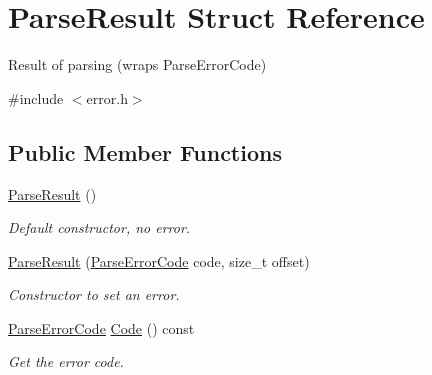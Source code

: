 \hypertarget{struct_parse_result}{}\section{Parse\+Result Struct Reference}
\label{struct_parse_result}


Result of parsing (wraps Parse\+Error\+Code)  




{\ttfamily \#include $<$error.\+h$>$}

\subsection*{Public Member Functions}
\begin{DoxyCompactItemize}
\item 
\mbox{\label{struct_parse_result_acd4a266f815bec59fa27f64f1923fe9e}} 
\hyperlink{struct_parse_result_acd4a266f815bec59fa27f64f1923fe9e}{Parse\+Result} ()
\begin{DoxyCompactList}\small\item\em Default constructor, no error. \end{DoxyCompactList}\item 
\mbox{\label{struct_parse_result_a38ca49a53e80633d0864ad5026adaf84}} 
\hyperlink{struct_parse_result_a38ca49a53e80633d0864ad5026adaf84}{Parse\+Result} (\hyperlink{group___r_a_p_i_d_j_s_o_n___e_r_r_o_r_s_ga8d4b32dfc45840bca189ade2bbcb6ba7}{Parse\+Error\+Code} code, size\+\_\+t offset)
\begin{DoxyCompactList}\small\item\em Constructor to set an error. \end{DoxyCompactList}\item 
\mbox{\label{struct_parse_result_a2aae3c2f42b31cc2409ee1e03bc4852e}} 
\hyperlink{group___r_a_p_i_d_j_s_o_n___e_r_r_o_r_s_ga8d4b32dfc45840bca189ade2bbcb6ba7}{Parse\+Error\+Code} \hyperlink{struct_parse_result_a2aae3c2f42b31cc2409ee1e03bc4852e}{Code} () const
\begin{DoxyCompactList}\small\item\em Get the error code. \end{DoxyCompactList}\item 
\mbox{\label{struct_parse_result_afbe762766ac21b2aae266105f1dfa643}} 

\end{DoxyCompactItemize}
